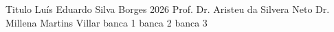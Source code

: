 \documentclass[12pt,openright]{book}
\begin{document}
%
%
%
\capa
{Titulo}
{Luís Eduardo Silva Borges}
{2026}
{Prof. Dr. Aristeu da Silvera Neto}
{Dr. Millena Martins Villar}
{banca 1}
{banca 2}
{banca 3}


\tableofcontents
\thispagestyle{empty}
\cleardoublepage
\end{document}
